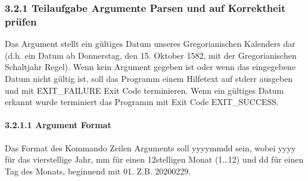 \documentclass[a4paper,10pt,english]{report}
\begin{document}
\subsubsection{3.2.1	Teilaufgabe Argumente Parsen und auf Korrektheit prüfen}
\label{\detokenize{P02_Funktionen_Datentyp_enum/README:teilaufgabe-argumente-parsen-und-auf-korrektheit-prufen}}
\sphinxAtStartPar
Das Argument stellt ein gültiges Datum unseres Gregorianischen Kalenders dar (d.h. ein Datum ab Donnerstag, den 15. Oktober 1582, mit der Gregorianischen Schaltjahr Regel).
Wenn kein Argument gegeben ist oder wenn das eingegebene Datum nicht gültig ist, soll das Programm einem Hilfetext auf stderr ausgeben und mit EXIT\_FAILURE Exit Code terminieren. Wenn ein gültiges Datum erkannt wurde terminiert das Programm mit Exit Code EXIT\_SUCCESS.


\paragraph{3.2.1.1 Argument Format}
\label{\detokenize{P02_Funktionen_Datentyp_enum/README:argument-format}}
\sphinxAtStartPar
Das Format des Kommando Zeilen Arguments soll yyyy\sphinxhyphen{}mm\sphinxhyphen{}dd sein, wobei yyyy für das vier\sphinxhyphen{}stellige Jahr, mm für einen 1\sphinxhyphen{}2\sphinxhyphen{}stelligen Monat (1…12) und dd für einen Tag des Monats, begin\sphinxhyphen{}nend mit 01. Z.B. 2020\sphinxhyphen{}02\sphinxhyphen{}29.
\end{document}
